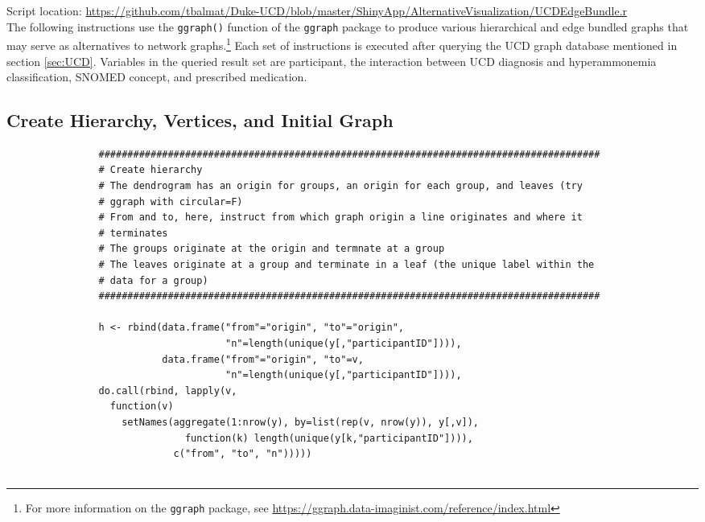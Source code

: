 \documentclass[10pt, letterpaper]{article}
\begin{document}
\begin{spacing}{1.0}
Script location:  \url{https://github.com/tbalmat/Duke-UCD/blob/master/ShinyApp/AlternativeVisualization/UCDEdgeBundle.r}\\

The following instructions use the \texttt{ggraph()} function of the \texttt{ggraph} package to produce various hierarchical and edge bundled graphs that may serve as alternatives to network graphs.\footnote{For more information on the \texttt{ggraph} package, see \url{https://ggraph.data-imaginist.com/reference/index.html}}  Each set of instructions is executed after querying the UCD graph database mentioned in section \ref{sec:UCD}.  Variables in the queried result set are participant, the interaction between UCD diagnosis and hyperammonemia classification, SNOMED concept, and prescribed medication.

\subsection{Create Hierarchy, Vertices, and Initial Graph}

\small
\begin{verbatim}
                #######################################################################################
                # Create hierarchy
                # The dendrogram has an origin for groups, an origin for each group, and leaves (try
                # ggraph with circular=F)
                # From and to, here, instruct from which graph origin a line originates and where it
                # terminates
                # The groups originate at the origin and termnate at a group
                # The leaves originate at a group and terminate in a leaf (the unique label within the
                # data for a group)
                #######################################################################################
                
                h <- rbind(data.frame("from"="origin", "to"="origin",
                                      "n"=length(unique(y[,"participantID"]))),
                           data.frame("from"="origin", "to"=v,
                                      "n"=length(unique(y[,"participantID"]))),
                do.call(rbind, lapply(v,
                  function(v)
                    setNames(aggregate(1:nrow(y), by=list(rep(v, nrow(y)), y[,v]),
                               function(k) length(unique(y[k,"participantID"]))),
                             c("from", "to", "n")))))
                

\end{verbatim}
\end{spacing}
\end{document}
